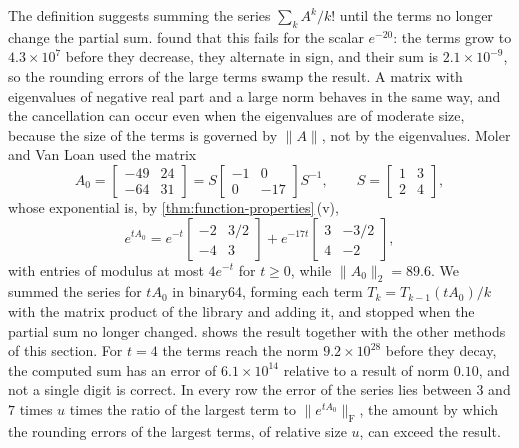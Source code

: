 The definition suggests summing the series $\sum_kA^k/k!$ until the terms no longer change the partial sum.  found that this fails for the scalar $e^{-20}$: the terms grow to $4.3\times10^7$ before they decrease, they alternate in sign, and their sum is $2.1\times10^{-9}$, so the rounding errors of the large terms swamp the result. A matrix with eigenvalues of negative real part and a large norm behaves in the same way, and the cancellation can occur even when the eigenvalues are of moderate size, because the size of the terms is governed by $\|A\|$, not by the eigenvalues. Moler and Van Loan used the matrix
\[
A_0=\begin{bmatrix}-49&24\\-64&31\end{bmatrix}=S\begin{bmatrix}-1&0\\0&-17\end{bmatrix}S^{-1},\qquad S=\begin{bmatrix}1&3\\2&4\end{bmatrix},
\]
whose exponential is, by \cref{thm:function-properties}\,(v),
\[
e^{tA_0}=e^{-t}\begin{bmatrix}-2&3/2\\-4&3\end{bmatrix}+e^{-17t}\begin{bmatrix}3&-3/2\\4&-2\end{bmatrix},
\]
with entries of modulus at most $4e^{-t}$ for $t\ge0$, while $\|A_0\|_2=89.6$. We summed the series for $tA_0$ in binary64, forming each term $T_k=T_{k-1}(tA_0)/k$ with the matrix product of the library and adding it, and stopped when the partial sum no longer changed.  shows the result together with the other methods of this section. For $t=4$ the terms reach the norm $9.2\times10^{28}$ before they decay, the computed sum has an error of $6.1\times10^{14}$ relative to a result of norm $0.10$, and not a single digit is correct. In every row the error of the series lies between $3$ and $7$ times $u$ times the ratio of the largest term to $\|e^{tA_0}\|_{\mathrm F}$, the amount by which the rounding errors of the largest terms, of relative size $u$, can exceed the result.

